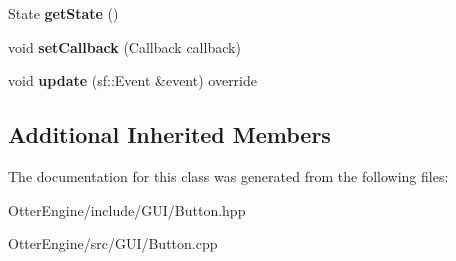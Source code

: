 \begin{DoxyCompactItemize}
\item 
State {\bfseries get\+State} ()\hypertarget{class_otter_engine_1_1_button_af80145188596555a5724b9e8dfed2b56}{}\label{class_otter_engine_1_1_button_af80145188596555a5724b9e8dfed2b56}

\item 
void {\bfseries set\+Callback} (Callback callback)\hypertarget{class_otter_engine_1_1_button_ad72d0714977884895ca18c3793a48a5d}{}\label{class_otter_engine_1_1_button_ad72d0714977884895ca18c3793a48a5d}

\item 
void {\bfseries update} (sf\+::\+Event \&event) override\hypertarget{class_otter_engine_1_1_button_aac25453110bb01e51bb55198c697c207}{}\label{class_otter_engine_1_1_button_aac25453110bb01e51bb55198c697c207}

\end{DoxyCompactItemize}
\subsection*{Additional Inherited Members}


The documentation for this class was generated from the following files\+:\begin{DoxyCompactItemize}
\item 
Otter\+Engine/include/\+G\+U\+I/Button.\+hpp\item 
Otter\+Engine/src/\+G\+U\+I/Button.\+cpp\end{DoxyCompactItemize}

